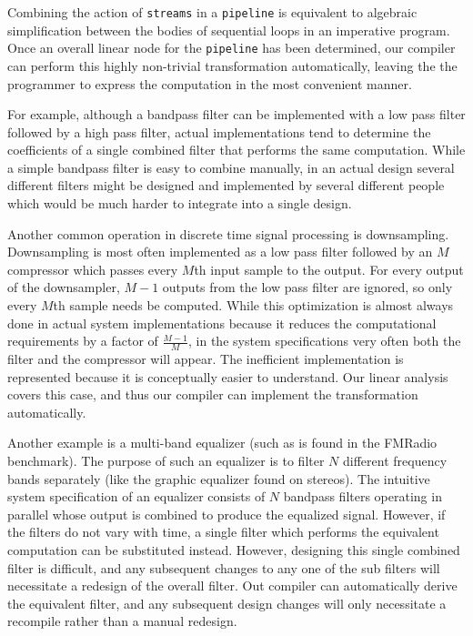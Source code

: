 Combining the action of {\tt streams} in a {\tt pipeline} is equivalent 
to algebraic simplification between the bodies of sequential loops in 
an imperative program. Once an overall linear node for the
{\tt pipeline} has been determined, our compiler can perform this highly non-trivial 
transformation automatically, leaving the the programmer to express 
the computation in the most convenient manner.

For example, although a bandpass filter can be implemented with a low
pass filter followed by a high pass filter, actual implementations
tend to determine the coefficients of a single combined filter that 
performs the same computation. While a simple bandpass filter is 
easy to combine manually, in an actual design several different 
filters might be designed and implemented by several different people 
which would be much harder to integrate into a single design.

Another common operation in discrete time signal processing is downsampling.
Downsampling is most often implemented as a low pass filter followed
by an $M$ compressor which passes every $M$th input sample to the
output.  For every output of the downsampler, $M-1$ outputs from the
low pass filter are ignored, so only every $M$th sample needs be
computed.  While this optimization is almost always done in actual
system implementations because it reduces the computational
requirements by a factor of $\frac{M-1}{M}$, in the system
specifications very often both the filter and the compressor will
appear. The inefficient implementation is represented because it is
conceptually easier to understand.  Our linear analysis covers this
case, and thus our compiler can implement the transformation
automatically.

Another example is a multi-band equalizer (such as is found in the
FMRadio benchmark).  The purpose of such an equalizer is to filter $N$
different frequency bands separately (like the graphic equalizer found
on stereos). The intuitive system specification of an equalizer
consists of $N$ bandpass filters operating in parallel whose output is
combined to produce the equalized signal. However, if the filters do
not vary with time, a single filter which performs the equivalent
computation can be substituted instead.  However, designing this
single combined filter is difficult, and any subsequent changes to any
one of the sub filters will necessitate a redesign of the overall
filter.  Out compiler can automatically derive the equivalent filter,
and any subsequent design changes will only necessitate a recompile
rather than a manual redesign.


